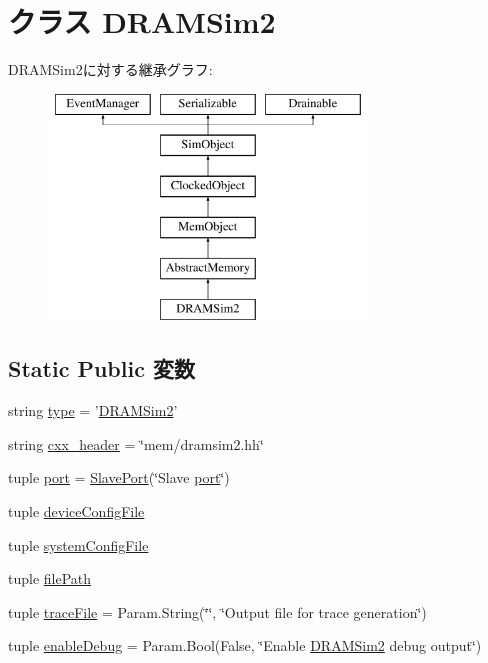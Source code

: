 \hypertarget{classDRAMSim2_1_1DRAMSim2}{
\section{クラス DRAMSim2}
\label{classDRAMSim2_1_1DRAMSim2}
}
DRAMSim2に対する継承グラフ:\begin{figure}[H]
\begin{center}
\leavevmode
\includegraphics[height=6cm]{classDRAMSim2_1_1DRAMSim2}
\end{center}
\end{figure}
\subsection*{Static Public 変数}
\begin{DoxyCompactItemize}
\item 
string \hyperlink{classDRAMSim2_1_1DRAMSim2_acce15679d830831b0bbe8ebc2a60b2ca}{type} = '\hyperlink{classDRAMSim2_1_1DRAMSim2}{DRAMSim2}'
\item 
string \hyperlink{classDRAMSim2_1_1DRAMSim2_a17da7064bc5c518791f0c891eff05fda}{cxx\_\-header} = \char`\"{}mem/dramsim2.hh\char`\"{}
\item 
tuple \hyperlink{classDRAMSim2_1_1DRAMSim2_a1aadf525515ecfcf662c2aa51a503763}{port} = \hyperlink{classSlavePort}{SlavePort}(\char`\"{}Slave \hyperlink{classDRAMSim2_1_1DRAMSim2_a1aadf525515ecfcf662c2aa51a503763}{port}\char`\"{})
\item 
tuple \hyperlink{classDRAMSim2_1_1DRAMSim2_a4b5e3cc9f96e106d875d9293a89f8e2b}{deviceConfigFile}
\item 
tuple \hyperlink{classDRAMSim2_1_1DRAMSim2_a2da83515e23819e805717a80908b8b0f}{systemConfigFile}
\item 
tuple \hyperlink{classDRAMSim2_1_1DRAMSim2_ac86ae01991020419ad74797268fe6d3f}{filePath}
\item 
tuple \hyperlink{classDRAMSim2_1_1DRAMSim2_a4c880f8f4590f0a754c7122072a21b4e}{traceFile} = Param.String(\char`\"{}\char`\"{}, \char`\"{}Output file for trace generation\char`\"{})
\item 
tuple \hyperlink{classDRAMSim2_1_1DRAMSim2_ae8a58e1159960431c8e7591c366d5d26}{enableDebug} = Param.Bool(False, \char`\"{}Enable \hyperlink{classDRAMSim2_1_1DRAMSim2}{DRAMSim2} debug output\char`\"{})
\end{DoxyCompactItemize}


